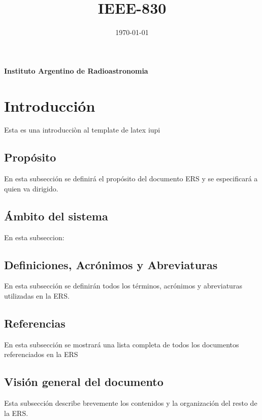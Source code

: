 \documentclass[12pt,a4paper, twosite]{article}
\date{\today}
\title{IEEE-830}
\begin{document}
\begin{titlepage}
	{\bfseries\LARGE Instituto Argentino de Radioastronomia \par}
	\vspace{1cm}
\end{titlepage}

\tableofcontents
\newpage


\section{Introducción}
\label{sec:org60390fa}

Esta es una introducciòn al template de latex iupi 

\subsection{Propósito}
\label{sec:org434c3ef}

En esta subsección se definirá el propósito del documento ERS y se
especificará a quien va dirigido.


\subsection{Ámbito del sistema}
\label{sec:org12e44a1}

En esta subseccion:


\subsection{Definiciones, Acrónimos y Abreviaturas}
\label{sec:orgb158e36}

En esta subsección se definirán todos los términos, acrónimos y
abreviaturas utilizadas en la ERS.


\subsection{Referencias}
\label{sec:org62711e0}

En esta subsección se mostrará una lista completa de todos los
documentos referenciados en la ERS


\subsection{Visión general del documento}
\label{sec:orgdaca22c}

Esta subsección describe brevemente los contenidos y la organización
del resto de la ERS.
\end{document}
